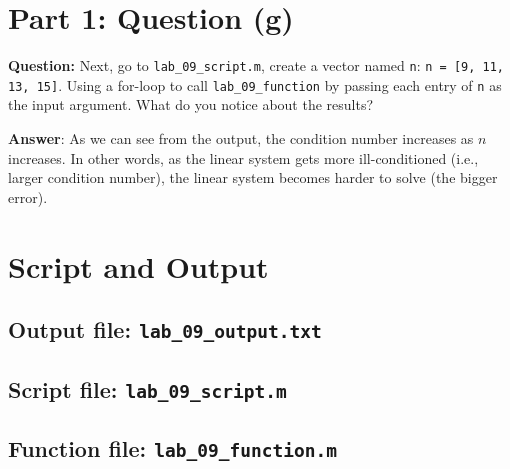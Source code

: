 \section*{Part 1: Question (g)}
\textbf{Question:} Next, go to \verb|lab_09_script.m|, create a vector named \verb|n|: \verb|n = [9, 11, 13, 15]|. Using a for-loop to call \verb|lab_09_function| by passing each entry of \verb|n| as the input argument. What do you notice about the results?

\textbf{Answer}:
As we can see from the output, the condition number increases as $n$ increases. In other words, as the linear system gets more ill-conditioned (i.e., larger condition number), the linear system becomes harder to solve (the bigger error).

\newpage
\section*{Script and Output}
\subsection*{Output file: \lstinline[style=Plain]{lab_09_output.txt}}

\newpage
\subsection*{Script file: \lstinline[style=Plain]{lab_09_script.m}}

\newpage
\subsection*{Function file:  \lstinline[style=Plain]{lab_09_function.m}}

